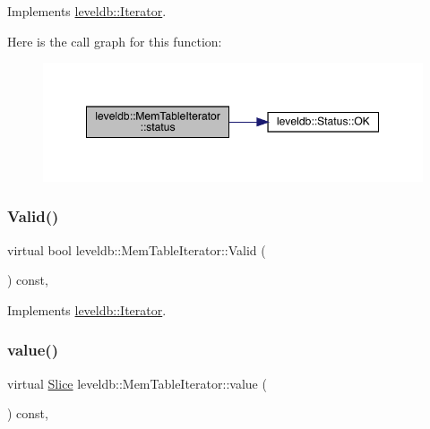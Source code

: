 Implements \mbox{\hyperlink{classleveldb_1_1_iterator_ac84f34623a031b7eeb23409320f76376}{leveldb\+::\+Iterator}}.

Here is the call graph for this function\+:
\nopagebreak
\begin{figure}[H]
\begin{center}
\leavevmode
\includegraphics[width=349pt]{classleveldb_1_1_mem_table_iterator_af9bc5f041cd319cfb44408d6bf5aa4a2_cgraph}
\end{center}
\end{figure}
\mbox{\label{classleveldb_1_1_mem_table_iterator_ab991decbbda3c3c76dbc1e3cce446b90}} 
\subsubsection{\texorpdfstring{Valid()}{Valid()}}
{\footnotesize\ttfamily virtual bool leveldb\+::\+Mem\+Table\+Iterator\+::\+Valid (\begin{DoxyParamCaption}{ }\end{DoxyParamCaption}) const\hspace{0.3cm}{\ttfamily [inline]}, {\ttfamily [virtual]}}



Implements \mbox{\hyperlink{classleveldb_1_1_iterator_a38614978bfa0586327b8e237bcb46012}{leveldb\+::\+Iterator}}.

\mbox{\label{classleveldb_1_1_mem_table_iterator_a6c2907c8c87d2b2933adcd5f0e01f781}} 
\subsubsection{\texorpdfstring{value()}{value()}}
{\footnotesize\ttfamily virtual \mbox{\hyperlink{classleveldb_1_1_slice}{Slice}} leveldb\+::\+Mem\+Table\+Iterator\+::value (\begin{DoxyParamCaption}{ }\end{DoxyParamCaption}) const\hspace{0.3cm}{\ttfamily [inline]}, {\ttfamily [virtual]}}



